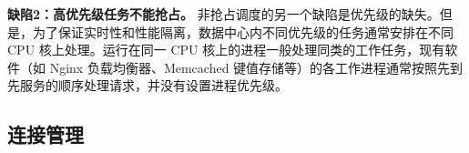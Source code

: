 \textbf{缺陷2：高优先级任务不能抢占。}
非抢占调度的另一个缺陷是优先级的缺失。但是，为了保证实时性和性能隔离，数据中心内不同优先级的任务通常安排在不同 CPU 核上处理。运行在同一 CPU 核上的进程一般处理同类的工作任务，现有软件（如 Nginx 负载均衡器、Memcached 键值存储等）的各工作进程通常按照先到先服务的顺序处理请求，并没有设置进程优先级。




\subsection{连接管理}
\label{socksdirect:subsec:connection-management}


